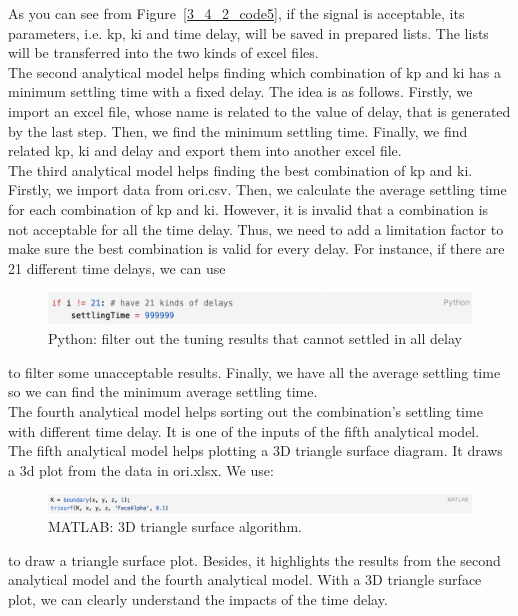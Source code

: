 As you can see from Figure~\ref{3_4_2_code5}, if the signal is acceptable, its parameters, i.e. kp, ki and time delay, will be saved in prepared lists. The lists will be transferred into the two kinds of excel files. \\

The second analytical model helps finding which combination of kp and ki has a minimum settling time with a fixed delay. The idea is as follows. Firstly, we import an excel file, whose name is related to the value of delay,  that is generated by the last step. Then, we find the minimum settling time. Finally, we find related kp, ki and delay and export them into another excel file. \\

The third analytical model helps finding the best combination of kp and ki. Firstly, we import data from ori.csv. Then, we calculate the average settling time for each combination of kp and ki. However, it is invalid that a combination is not acceptable for all the time delay. Thus, we need to add a limitation factor to make sure the best combination is valid for every delay. For instance, if there are 21 different time delays, we can use 

\begin{figure}[htbp]
\centering
\includegraphics[width = .999\textwidth]{figure/3_4_2_code6.png}
\caption{Python: filter out the tuning results that cannot settled in all delay}
\label{3_4_2_code6}
\end{figure}

to filter some unacceptable results. Finally, we have all the average settling time so we can find the minimum average settling time. \\

The fourth analytical model helps sorting out the combination’s settling time with different time delay. It is one of the inputs of the fifth analytical model. \\

The fifth analytical model helps plotting a 3D triangle surface diagram. It draws a 3d plot from the data in ori.xlsx. We use: 

\begin{figure}[htbp]
\centering
\includegraphics[width = .999\textwidth]{figure/3_4_2_code7.png}
\caption{MATLAB: 3D triangle surface algorithm.}
\label{3_4_2_code7}
\end{figure}

to draw a triangle surface plot. Besides, it highlights the results from the second analytical model and the fourth analytical model. With a 3D triangle surface plot, we can clearly understand the impacts of the time delay. 